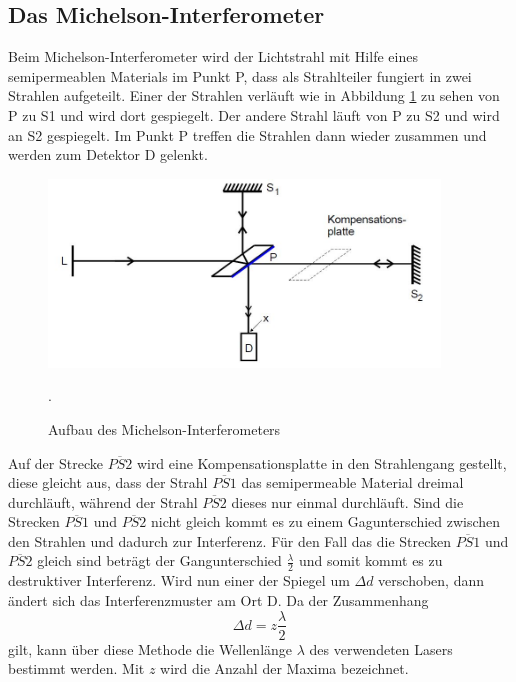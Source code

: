 \subsection{Das Michelson-Interferometer}
Beim Michelson-Interferometer wird der Lichtstrahl mit Hilfe eines semipermeablen Materials im Punkt P, dass
als Strahlteiler fungiert in zwei Strahlen aufgeteilt. Einer der Strahlen verläuft wie in
Abbildung \ref{fig:michel} zu sehen von P zu S1 und wird dort gespiegelt. Der andere Strahl läuft von
P zu S2 und wird an S2 gespiegelt. Im Punkt P treffen die Strahlen dann wieder zusammen und
werden zum Detektor D gelenkt.

\begin{figure}[H]
  \centering
  \includegraphics[height=5cm]{Michel.JPG}
  \caption{Aufbau des Michelson-Interferometers}
  \label{fig:michel}
  \cite{skript}.
\end{figure}

Auf der Strecke $\overline{PS2}$ wird eine Kompensationsplatte in den Strahlengang gestellt, diese
gleicht aus, dass der Strahl $\overline{PS1}$ das semipermeable Material dreimal durchläuft, während
der Strahl $\overline{PS2}$ dieses nur einmal durchläuft.
Sind die Strecken $\overline{PS1}$ und $\overline{PS2}$ nicht gleich kommt es zu einem Gagunterschied
zwischen den Strahlen und dadurch zur Interferenz.
Für den Fall das die Strecken $\overline{PS1}$ und $\overline{PS2}$ gleich sind beträgt der
Gangunterschied $\frac{\lambda}{2}$ und somit kommt es zu destruktiver Interferenz.
Wird nun einer der Spiegel um $\Delta d$ verschoben, dann ändert sich das Interferenzmuster
am Ort D. Da der Zusammenhang
\begin{equation}
  \Delta d = z \frac{\lambda}{2}
  \label{eqn:interferenz}
\end{equation}
gilt, kann über diese Methode die Wellenlänge $\lambda$ des verwendeten Lasers bestimmt werden.
Mit $z$ wird die Anzahl der Maxima bezeichnet.\\

